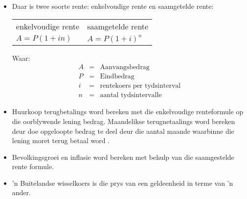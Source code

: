 \begin{itemize}
    \item Daar is twee soorte rente: enkelvoudige rente en saamgetelde rente:\\
    
    \begin{tabularx}{\textwidth}{ XX }
	enkelvoudige rente	&	saamgetelde rente\\
	$A = P (1 + in)$	&	$A = P(1 + i)^n$\\
    \end{tabularx}
    \par
    Waar:
    \begin{eqnarray*}
	A &=& \mbox{Aanvangsbedrag}\\
	P &=& \mbox{Eindbedrag}\\
	i &=& \mbox{rentekoers per tydsinterval}\\
	n &=& \mbox{aantal tydsintervalle}
    \end{eqnarray*}

    \item Huurkoop terugbetalings word bereken met die enkelvoudige renteformule op die oorblywende lening bedrag. Maandelikse terugnetaalings word bereken deur doe opgeloopte bedrag te deel deur die aantal maande waarbinne die lening moret terug betaal word .

    \item Bevolkingsgroei en inflasie word bereken met behulp van die saamgestelde rente formule.

    \item ’n Buitelandse wisselkoers is die prys van een geldeenheid in terme van ’n ander.
\end{itemize}



